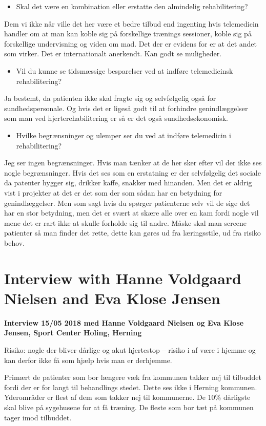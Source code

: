 \begin{itemize}
	\item Skal det være en kombination eller erstatte den almindelig rehabilitering?
\end{itemize}  
Dem vi ikke når ville det her være et bedre tilbud end ingenting hvis telemedicin handler om at man kan koble sig på forskellige trænings sessioner, koble sig på forskellige undervisning og viden om mad. Det der er evidens for er at det andet som virker. Det er internationalt anerkendt. Kan godt se muligheder. 

\begin{itemize}
	\item Vil du kunne se tidsmæssige besparelser ved at indføre telemedicinsk rehabilitering?
\end{itemize} 
Ja bestemt, da patienten ikke skal fragte sig og selvfølgelig også for sundhedspersonale. Og hvis det er ligeså godt til at forhindre genindlæggelser som man ved hjerterehabilitering er så er det også sundhedsøkonomisk. 

\begin{itemize}
	\item Hvilke begrænsninger og ulemper ser du ved at indføre telemedicin i rehabilitering? 
\end{itemize} 
Jeg ser ingen begrænsninger. Hvis man tænker at de her sker efter vil der ikke ses nogle begrænsninger. Hvis det ses som en erstatning er der selvfølgelig det sociale da patenter hygger sig, drikker kaffe, snakker med hinanden. Men det er aldrig vist i projekter at det er det som der som sådan har en betydning for genindlæggelser. Men som sagt hvis du spørger patienterne selv vil de sige det har en stor betydning, men det er svært at skære alle over en kam fordi nogle vil mene det er rart ikke at skulle forholde sig til andre. Måske skal man screene patienter så man finder det rette, dette kan gøres ud fra læringsstile, ud fra risiko behov. 

\chapter{Interview with Hanne Voldgaard Nielsen and Eva Klose Jensen} \label{hanne}
\textbf{Interview 15/05 2018 med Hanne Voldgaard Nielsen og Eva Klose Jensen, Sport Center Holing, Herning}

Risiko: nogle der bliver dårlige og akut hjertestop – risiko i af være i hjemme og kan derfor ikke få som hjælp hvis man er derhjemme. 

Primært de patienter som bor længere væk fra kommunen takker nej til tilbuddet fordi der er for langt til behandlings stedet. Dette ses ikke i Herning kommunen. Yderområder er flest af dem som takker nej til kommunerne. De 10\% dårligste skal blive på sygehusene for at få træning. De fleste som bor tæt på kommunen tager imod tilbuddet. 

